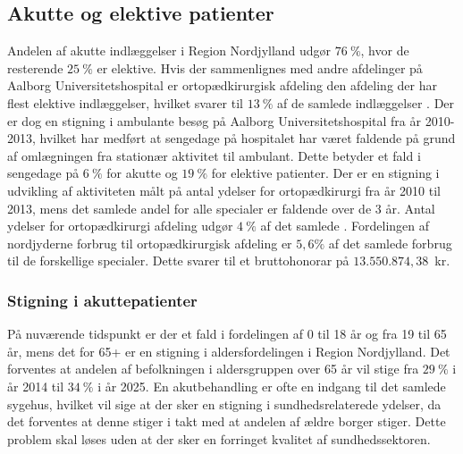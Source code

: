 \subsection{Akutte og elektive patienter}
Andelen af akutte indlæggelser i Region Nordjylland udgør $76~\%$, hvor de resterende $25~\%$ er elektive. Hvis der sammenlignes med andre afdelinger på Aalborg Universitetshospital er ortopædkirurgisk afdeling den afdeling der har flest elektive indlæggelser, hvilket svarer til $13~\%$ af de samlede indlæggelser . Der er dog en stigning i ambulante besøg på Aalborg Universitetshospital fra år 2010-2013, hvilket har medført at sengedage på hospitalet har været faldende på grund af omlægningen fra stationær aktivitet til ambulant. Dette betyder et fald i sengedage på $6~\%$ for akutte og $19~\%$ for elektive patienter. Der er en stigning i udvikling af aktiviteten målt på antal ydelser for ortopædkirurgi fra år 2010 til 2013, mens det samlede andel for alle specialer er faldende over de 3 år. Antal ydelser for ortopædkirurgi afdeling udgør $4~\%$ af det samlede . Fordelingen af nordjyderne forbrug til ortopædkirurgisk afdeling er $5,6\%$ af det samlede forbrug til de forskellige specialer. Dette svarer til et bruttohonorar på $13.550.874,38$~kr. \cite{RegionNord2016}

\subsubsection{Stigning i akuttepatienter}
På nuværende tidspunkt er der et fald i fordelingen af 0 til 18 år og fra 19 til 65 år, mens det for 65+ er en stigning i aldersfordelingen i Region Nordjylland. Det forventes at andelen af befolkningen i aldersgruppen over 65 år vil stige fra $29~\%$ i år 2014 til $34~\%	$ i år 2025. En akutbehandling er ofte en indgang til det samlede sygehus, hvilket vil sige at der sker en stigning i sundhedsrelaterede ydelser, da det forventes at denne stiger i takt med at andelen af ældre borger stiger. Dette problem skal løses uden at der sker en forringet kvalitet af sundhedssektoren. 